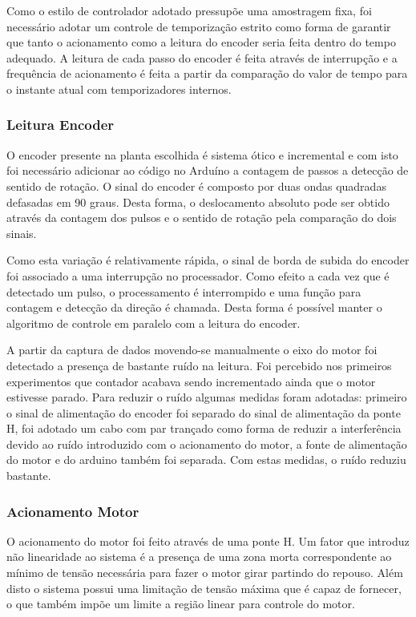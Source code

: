 \documentclass[a4paper,11pt]{article}
\begin{document}
Como o estilo de controlador adotado pressupõe uma amostragem fixa, foi necessário adotar um controle de temporização estrito como forma de garantir que tanto o acionamento como a leitura do encoder seria feita dentro do tempo adequado. A leitura de cada passo do encoder é feita através de interrupção e a frequência de acionamento é feita a partir da comparação do valor de tempo para o instante atual com temporizadores internos.

\subsubsection{Leitura Encoder}

O encoder presente na planta escolhida é sistema ótico e incremental e com isto foi necessário adicionar ao código no Arduíno a contagem de passos a detecção de sentido de rotação. O sinal do encoder é composto por duas ondas quadradas defasadas em 90 graus. Desta forma, o deslocamento absoluto pode ser obtido através da contagem dos pulsos e o sentido de rotação pela comparação do dois sinais.


Como esta variação é relativamente rápida, o sinal de borda de subida do encoder foi associado a uma interrupção no processador. Como efeito a cada vez que é detectado um pulso, o processamento é interrompido e uma função para contagem e detecção da direção é chamada. Desta forma é possível manter o algoritmo de controle em paralelo com a leitura do encoder.

A partir da captura de dados movendo-se manualmente o eixo do motor foi detectado a presença de bastante ruído na leitura. Foi percebido nos primeiros experimentos que contador acabava sendo incrementado ainda que o motor estivesse parado. Para reduzir o ruído algumas medidas foram adotadas: primeiro o sinal de alimentação do encoder foi separado do sinal de alimentação da ponte H, foi adotado um cabo com par trançado como forma de reduzir a interferência devido ao ruído introduzido com o acionamento do motor, a fonte de alimentação do motor e do arduino também foi separada. Com estas medidas, o ruído reduziu bastante.

\subsubsection{Acionamento Motor}

O acionamento do motor foi feito através de uma ponte H. Um fator que introduz não linearidade ao sistema é a presença de uma zona morta correspondente ao mínimo de tensão necessária para fazer o motor girar partindo do repouso. Além disto o sistema possui uma limitação de tensão máxima que é capaz de fornecer, o que também impõe um limite a região linear para controle do motor.
\end{document}
